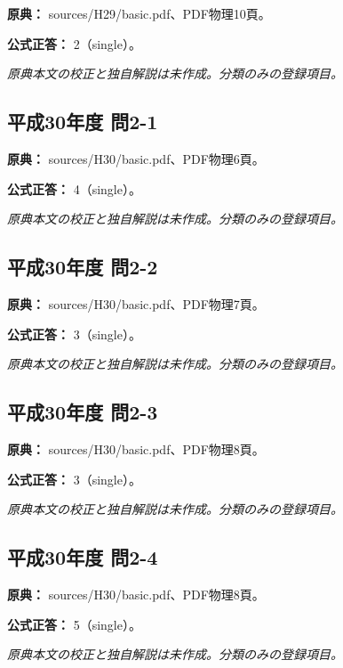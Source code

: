 \noindent\textbf{原典：} sources/H29/basic.pdf、PDF物理10頁。

\textbf{公式正答：} 2（single）。

\par\textit{原典本文の校正と独自解説は未作成。分類のみの登録項目。}

\subsection{平成30年度 問2-1}
\label{q:h30-reg-basic-2-1}

\noindent\textbf{原典：} sources/H30/basic.pdf、PDF物理6頁。

\textbf{公式正答：} 4（single）。

\par\textit{原典本文の校正と独自解説は未作成。分類のみの登録項目。}

\subsection{平成30年度 問2-2}
\label{q:h30-reg-basic-2-2}

\noindent\textbf{原典：} sources/H30/basic.pdf、PDF物理7頁。

\textbf{公式正答：} 3（single）。

\par\textit{原典本文の校正と独自解説は未作成。分類のみの登録項目。}

\subsection{平成30年度 問2-3}
\label{q:h30-reg-basic-2-3}

\noindent\textbf{原典：} sources/H30/basic.pdf、PDF物理8頁。

\textbf{公式正答：} 3（single）。

\par\textit{原典本文の校正と独自解説は未作成。分類のみの登録項目。}

\subsection{平成30年度 問2-4}
\label{q:h30-reg-basic-2-4}

\noindent\textbf{原典：} sources/H30/basic.pdf、PDF物理8頁。

\textbf{公式正答：} 5（single）。

\par\textit{原典本文の校正と独自解説は未作成。分類のみの登録項目。}

